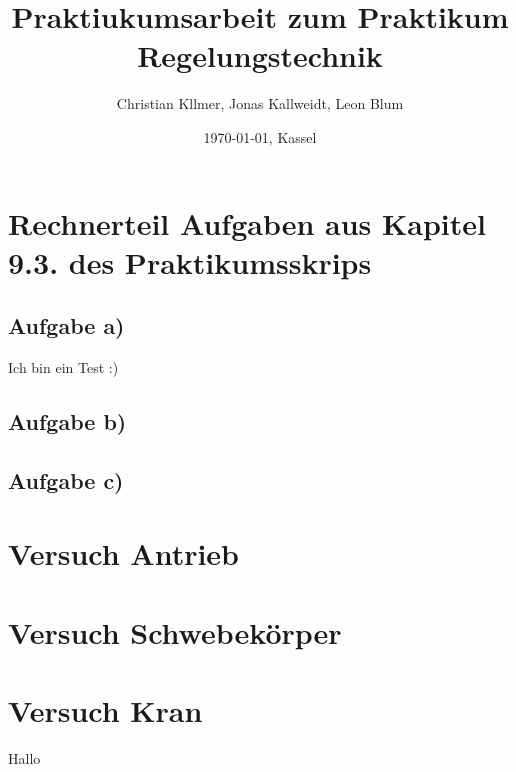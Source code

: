 \documentclass[11pt]{scrartcl}
\begin{document}
\title{Praktiukumsarbeit zum Praktikum Regelungstechnik}
\author{Christian Kllmer, Jonas Kallweidt, Leon Blum}
\date{\today{}, Kassel}
\maketitle
\newpage
\renewcommand{\contentsname}{Inhaltsverzeichnis}
\tableofcontents
\newpage

\section{Rechnerteil Aufgaben aus Kapitel 9.3. des Praktikumsskrips}

\subsection{Aufgabe a)}

Ich bin ein Test :)

\subsection{Aufgabe b)}

\subsection{Aufgabe c)}

\section{Versuch Antrieb}

\section{Versuch Schwebekörper}

\section{Versuch Kran}

Hallo
\end{document}
